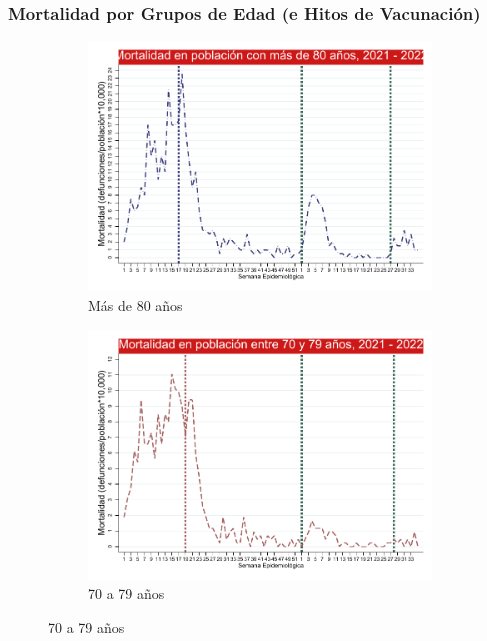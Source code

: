 \documentclass[xcolor=table]{beamer}
\begin{document}
\begin{frame}
	\frametitle{Mortalidad por Grupos de Edad (e Hitos de Vacunación)}
	\vspace{.5cm}
	\begin{figure}
		\centering
		\begin{subfigure}[b]{0.3\textwidth}
			\centering
			\includegraphics[width=\textwidth]{../figuras/mortalidad_edad_80.pdf}
			\caption{Más de 80 años}
		\end{subfigure}
		\hfill
		\begin{subfigure}[b]{0.3\textwidth}
			\centering
			\includegraphics[width=\textwidth]{../figuras/mortalidad_edad_70.pdf}
			\caption{70 a 79 años}
		\end{subfigure}

\end{figure}
\end{frame}
\end{document}
